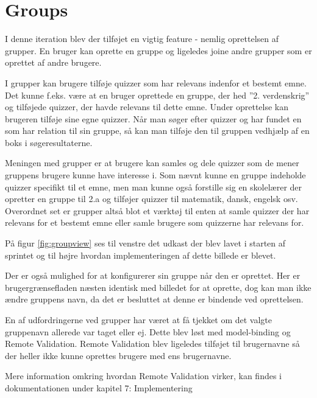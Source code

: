 \section{Groups}

I denne iteration blev der tilføjet en vigtig feature - nemlig oprettelsen af grupper.
En bruger kan oprette en gruppe og ligeledes joine andre grupper som er oprettet af andre brugere.

I grupper kan brugere tilføje quizzer som har relevans indenfor et bestemt emne. Det kunne f.eks. være at en bruger oprettede en gruppe, der hed ''2. verdenskrig'' og tilføjede quizzer, der havde relevans til dette emne. Under oprettelse kan brugeren tilføje sine egne quizzer. Når man søger efter quizzer og har fundet en som har relation til sin gruppe, så kan man tilføje den til gruppen vedhjælp af en boks i søgeresultaterne.

Meningen med grupper er at brugere kan samles og dele quizzer som de mener gruppens brugere kunne have interesse i.  Som nævnt kunne en gruppe indeholde quizzer specifikt til et emne, men man kunne også forstille sig en skolelærer der opretter en gruppe til 2.a og tilføjer quizzer til matematik, dansk, engelsk osv. Overordnet set er grupper altså blot et værktøj til enten at samle quizzer der har relevans for et bestemt emne eller samle brugere som quizzerne har relevans for.


På figur \ref{fig:groupview} ses til venstre det udkast der blev lavet i starten af sprintet og til højre hvordan implementeringen af dette billede er blevet.

Der er også mulighed for at konfigurerer sin gruppe når den er oprettet. Her er brugergrænsefladen næsten identisk med billedet for at oprette, dog kan man ikke ændre gruppens navn, da det er besluttet at denne er bindende ved oprettelsen.

En af udfordringerne ved grupper har været at få tjekket om det valgte gruppenavn allerede var taget eller ej. Dette blev løst med model-binding og Remote Validation. Remote Validation blev ligeledes tilføjet til brugernavne så der heller ikke kunne oprettes brugere med ens brugernavne.

Mere information omkring hvordan Remote Validation virker, kan findes i dokumentationen under kapitel 7: Implementering
